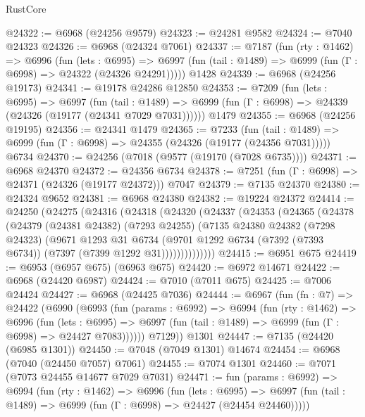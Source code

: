 \begin{lexlean}{RustCore}
\begin{coremodule}
@24322 := @6968 (@24256 @9579)
@24323 := @24281 @9582
@24324 := @7040 @24323
@24326 := @6968 (@24324 @7061)
@24337 := @7187
    (fun (rty : @1462) =>
    @6996
      (fun (lets : @6995) =>
      @6997 (fun (tail : @1489) => @6999 (fun (Γ : @6998) => @24322 (@24326 @24291)))))
    @1428
@24339 := @6968 (@24256 @19173)
@24341 := @19178 @24286 @12850
@24353 := @7209
    (fun (lets : @6995) =>
    @6997
      (fun (tail : @1489) =>
      @6999 (fun (Γ : @6998) => @24339 (@24326 (@19177 (@24341 @7029 @7031))))))
    @1479
@24355 := @6968 (@24256 @19195)
@24356 := @24341 @1479
@24365 := @7233
    (fun (tail : @1489) => @6999 (fun (Γ : @6998) => @24355 (@24326 (@19177 (@24356 @7031)))))
    @6734
@24370 := @24256 (@7018 (@9577 (@19170 (@7028 @6735))))
@24371 := @6968 @24370
@24372 := @24356 @6734
@24378 := @7251 (fun (Γ : @6998) => @24371 (@24326 (@19177 @24372))) @7047
@24379 := @7135 @24370
@24380 := @24324 @9652
@24381 := @6968 @24380
@24382 := @19224 @24372
@24414 := @24250
    (@24275
      (@24316
        (@24318
          (@24320
            (@24337
              (@24353
                (@24365
                  (@24378
                    (@24379
                      (@24381 @24382)
                      (@7293 @24255)
                      (@7135
                        @24380
                        @24382
                        (@7298 @24323)
                        (@9671
                          @1293
                          @31
                          @6734
                          (@9701
                            @1292
                            @6734
                            (@7392 (@7393 @6734))
                            (@7397 (@7399 @1292 @31))))))))))))))
@24415 := @6951 @675
@24419 := @6953 (@6957 @675) (@6963 @675)
@24420 := @6972 @14671
@24422 := @6968 (@24420 @6987)
@24424 := @7010 (@7011 @675)
@24425 := @7006 @24424
@24427 := @6968 (@24425 @7036)
@24444 := @6967
    (fun (fn : @7) =>
    @24422
      (@6990
        (@6993
          (fun (params : @6992) =>
          @6994
            (fun (rty : @1462) =>
            @6996
              (fun (lets : @6995) =>
              @6997 (fun (tail : @1489) => @6999 (fun (Γ : @6998) => @24427 @7083))))))
        @7129))
    @1301
@24447 := @7135 (@24420 (@6985 @1301))
@24450 := @7048 (@7049 @1301) @14674
@24454 := @6968 (@7040 (@24450 @7057) @7061)
@24455 := @7074 @1301
@24460 := @7071 (@7073 @24455 @14677 @7029 @7031)
@24471 := fun (params : @6992) =>
  @6994
    (fun (rty : @1462) =>
    @6996
      (fun (lets : @6995) =>
      @6997 (fun (tail : @1489) => @6999 (fun (Γ : @6998) => @24427 (@24454 @24460)))))

\end{coremodule}
\end{lexlean}
